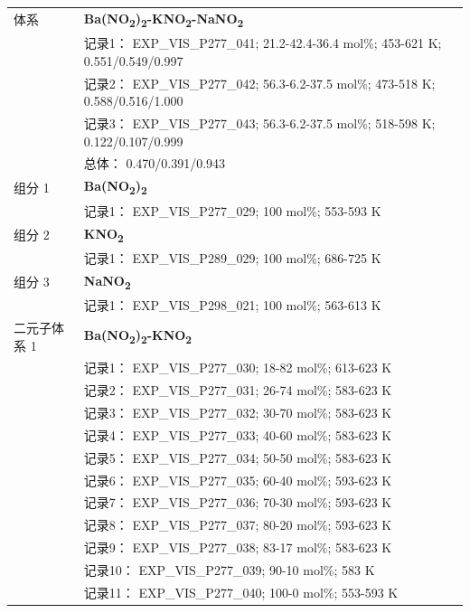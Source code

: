 \documentclass[12pt]{article}
\begin{document}
{\begin{longtable}[]{@{}
  >{\raggedright\arraybackslash}p{}
  >{\raggedright\arraybackslash}p{}@{}}
\midrule
体系 & \textbf{Ba(NO\textsubscript{2})\textsubscript{2}-KNO\textsubscript{2}-NaNO\textsubscript{2}} \\
 & 记录1： EXP\_VIS\_P277\_041; 21.2-42.4-36.4 mol\%; 453-621 K; 0.551/0.549/0.997 \\
 & 记录2： EXP\_VIS\_P277\_042; 56.3-6.2-37.5 mol\%; 473-518 K; 0.588/0.516/1.000 \\
 & 记录3： EXP\_VIS\_P277\_043; 56.3-6.2-37.5 mol\%; 518-598 K; 0.122/0.107/0.999 \\
 & 总体： 0.470/0.391/0.943  \\

组分 1  & \textbf{Ba(NO\textsubscript{2})\textsubscript{2}} \\
 & 记录1： EXP\_VIS\_P277\_029; 100 mol\%; 553-593 K  \\

组分 2  & \textbf{KNO\textsubscript{2}} \\
 & 记录1： EXP\_VIS\_P289\_029; 100 mol\%; 686-725 K  \\

组分 3  & \textbf{NaNO\textsubscript{2}} \\
 & 记录1： EXP\_VIS\_P298\_021; 100 mol\%; 563-613 K  \\

二元子体系 1  & \textbf{Ba(NO\textsubscript{2})\textsubscript{2}-KNO\textsubscript{2}} \\
 & 记录1： EXP\_VIS\_P277\_030; 18-82 mol\%; 613-623 K \\
 & 记录2： EXP\_VIS\_P277\_031; 26-74 mol\%; 583-623 K \\
 & 记录3： EXP\_VIS\_P277\_032; 30-70 mol\%; 583-623 K \\
 & 记录4： EXP\_VIS\_P277\_033; 40-60 mol\%; 583-623 K \\
 & 记录5： EXP\_VIS\_P277\_034; 50-50 mol\%; 583-623 K \\
 & 记录6： EXP\_VIS\_P277\_035; 60-40 mol\%; 593-623 K \\
 & 记录7： EXP\_VIS\_P277\_036; 70-30 mol\%; 593-623 K \\
 & 记录8： EXP\_VIS\_P277\_037; 80-20 mol\%; 593-623 K \\
 & 记录9： EXP\_VIS\_P277\_038; 83-17 mol\%; 583-623 K \\
 & 记录10： EXP\_VIS\_P277\_039; 90-10 mol\%; 583 K \\
 & 记录11： EXP\_VIS\_P277\_040; 100-0 mol\%; 553-593 K  \\


\end{longtable}}
\end{document}
